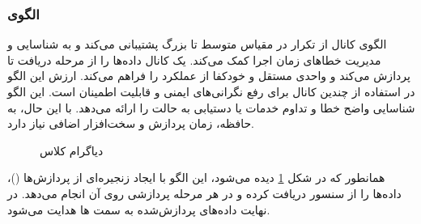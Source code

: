 \subsubsection{الگوی }
\label{safeChannelSec}
\begin{RTL}
الگوی کانال \cite{ref1} از تکرار در مقیاس متوسط
تا بزرگ پشتیبانی می‌کند و به شناسایی و مدیریت خطاهای زمان اجرا کمک می‌کند.
یک کانال داده‌ها را از مرحله دریافت تا  پردازش می‌کند
و واحدی مستقل و خودکفا از عملکرد را فراهم می‌کند. ارزش این الگو
در استفاده از چندین کانال برای رفع نگرانی‌های
ایمنی و قابلیت اطمینان است. این الگو شناسایی واضح خطا
و تداوم خدمات یا دستیابی به حالت  را ارائه می‌دهد.
با این حال، به حافظه، زمان پردازش و سخت‌افزار اضافی نیاز دارد.
\end{RTL}
\begin{figure}[h!]
\centering
{}
\caption{دیاگرام کلاس }
\label{safeChannelClassDiag}
\end{figure}
\begin{RTL}
همانطور که در شکل \ref{safeChannelClassDiag} دیده می‌شود،
این الگو با ایجاد زنجیره‌ای از پردازش‌ها ()،
داده‌ها را از سنسور دریافت کرده و در هر مرحله پردازشی روی آن انجام می‌دهد.
در نهایت داده‌های پردازش‌شده به سمت ها هدایت می‌شود.
\end{RTL}